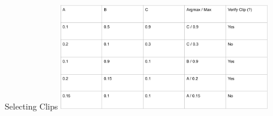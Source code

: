 





\begin{frame}{Selecting Clips}
    \centering
    \includegraphics[height=0.7\textheight,width=0.7\textwidth,keepaspectratio]{./images/clip_selection_process.png}
\end{frame}

